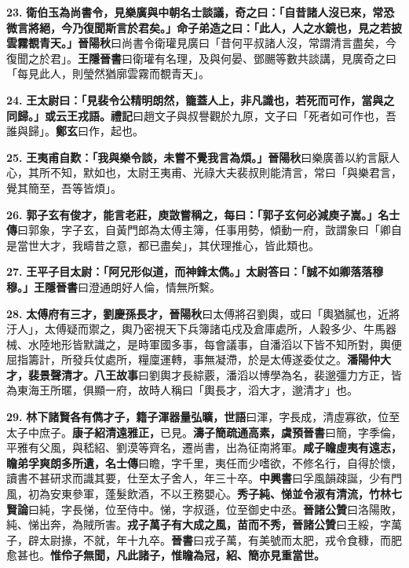 \textbf{23.} \textbf{衛伯玉為尚書令，見樂廣與中朝名士談議，奇之曰：「自昔諸人沒已來，常恐微言將絕，今乃復聞斯言於君矣。」命子弟造之曰：「此人，人之水鏡也，見之若披雲霧覩青天。」}{\footnotesize \textbf{晉陽秋}曰尚書令衛瓘見廣曰「昔何平叔諸人沒，常謂清言盡矣，今復聞之於君」。\textbf{王隱晉書}曰衛瓘有名理，及與何晏、鄧颺等數共談講，見廣奇之曰「每見此人，則瑩然猶廓雲霧而覩青天」。}

\textbf{24.} \textbf{王太尉曰：「見裴令公精明朗然，籠蓋人上，非凡識也，若死而可作，當與之同歸。」或云王戎語。}{\footnotesize \textbf{禮記}曰趙文子與叔譽觀於九原，文子曰「死者如可作也，吾誰與歸」。\textbf{鄭玄}曰作，起也。}

\textbf{25.} \textbf{王夷甫自歎：「我與樂令談，未嘗不覺我言為煩。」}{\footnotesize \textbf{晉陽秋}曰樂廣善以約言厭人心，其所不知，默如也，太尉王夷甫、光祿大夫裴叔則能清言，常曰「與樂君言，覺其簡至，吾等皆煩」。}

\textbf{26.} \textbf{郭子玄有俊才，能言老莊，庾敳嘗稱之，每曰：「郭子玄何必減庾子嵩。」}{\footnotesize \textbf{名士傳}曰郭象，字子玄，自黃門郎為太傅主簿，任事用勢，傾動一府，敳謂象曰「卿自是當世大才，我疇昔之意，都已盡矣」，其伏理推心，皆此類也。}

\textbf{27.} \textbf{王平子目太尉：「阿兄形似道，而神鋒太儁。」太尉答曰：「誠不如卿落落穆穆。」}{\footnotesize \textbf{王隱晉書}曰澄通朗好人倫，情無所繫。}

\textbf{28.} \textbf{太傅府有三才，劉慶孫長才，}{\footnotesize \textbf{晉陽秋}曰太傅將召劉輿，或曰「輿猶膩也，近將汙人」，太傅疑而禦之，輿乃密視天下兵簿諸屯戍及倉庫處所，人穀多少、牛馬器械、水陸地形皆默識之，是時軍國多事，每會議事，自潘滔以下皆不知所對，輿便屈指籌計，所發兵仗處所，糧廩運轉，事無凝滯，於是太傅遂委仗之。}\textbf{潘陽仲大才，裴景聲清才。}{\footnotesize \textbf{八王故事}曰劉輿才長綜覈，潘滔以博學為名，裴邈彊力方正，皆為東海王所暱，俱顯一府，故時人稱曰「輿長才，滔大才，邈清才」也。}

\textbf{29.} \textbf{林下諸賢各有儁才子，籍子渾器量弘曠，}{\footnotesize \textbf{世語}曰渾，字長成，清虛寡欲，位至太子中庶子。}\textbf{康子紹清遠雅正，}{\footnotesize 已見。}\textbf{濤子簡疏通高素，}{\footnotesize \textbf{虞預晉書}曰簡，字季倫，平雅有父風，與嵇紹、劉漠等齊名，遷尚書，出為征南將軍。}\textbf{咸子瞻虛夷有遠志，瞻弟孚爽朗多所遺，}{\footnotesize \textbf{名士傳}曰瞻，字千里，夷任而少嗜欲，不修名行，自得於懷，讀書不甚研求而識其要，仕至太子舍人，年三十卒。\textbf{中興書}曰孚風韻疎誕，少有門風，初為安東參軍，蓬髮飲酒，不以王務嬰心。}\textbf{秀子純、悌並令淑有清流，}{\footnotesize \textbf{竹林七賢論}曰純，字長悌，位至侍中。悌，字叔遜，位至御史中丞。\textbf{晉諸公贊}曰洛陽敗，純、悌出奔，為賊所害。}\textbf{戎子萬子有大成之風，苗而不秀，}{\footnotesize \textbf{晉諸公贊}曰王綏，字萬子，辟太尉掾，不就，年十九卒。\textbf{晉書}曰戎子萬，有美號而太肥，戎令食穅，而肥愈甚也。}\textbf{惟伶子無聞，凡此諸子，惟瞻為冠，紹、簡亦見重當世。}

